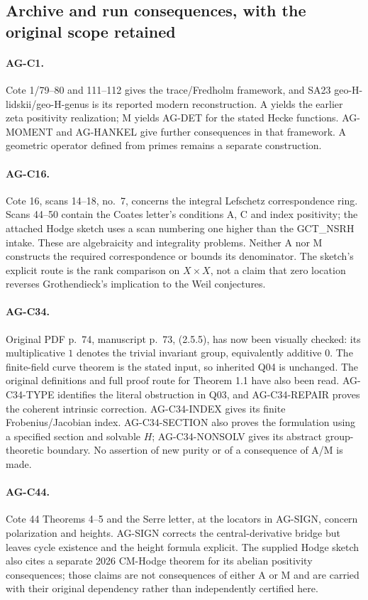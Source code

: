 \subsection{Archive and run consequences, with the original scope retained}
\label{ag:archive}

\paragraph{AG-C1.} Cote 1/79--80 and 111--112 gives the trace/Fredholm
framework, and SA23 geo-H-lidskii/geo-H-genus is its reported modern
reconstruction. A yields the earlier zeta positivity realization;
M yields AG-DET for the stated Hecke functions. AG-MOMENT and AG-HANKEL
give further consequences in that framework. A geometric operator defined
from primes remains a separate construction.

\paragraph{AG-C16.} Cote 16, scans 14--18, no.~7, concerns the integral
Lefschetz correspondence ring. Scans 44--50 contain the Coates letter's
conditions A, C and index positivity; the attached Hodge sketch uses a scan
numbering one higher than the GCT\_NSRH intake. These are algebraicity and
integrality problems. Neither A nor M constructs the required
correspondence or bounds its denominator. The sketch's explicit route is
the rank comparison on $X\times X$, not a claim that zero location
reverses Grothendieck's implication to the Weil conjectures.

\paragraph{AG-C34.} Original PDF p.~74, manuscript p.~73, (2.5.5),
has now been visually checked: its multiplicative $1$ denotes the trivial
invariant group, equivalently additive $0$. The finite-field curve theorem
is the stated input, so inherited Q04 is unchanged. The original
definitions and full proof route for Theorem 1.1 have also been read.
AG-C34-TYPE identifies the literal obstruction in Q03, and
AG-C34-REPAIR proves the coherent intrinsic correction. AG-C34-INDEX
gives its finite Frobenius/Jacobian index. AG-C34-SECTION also proves
the formulation using a specified section and solvable $H$;
AG-C34-NONSOLV gives its abstract group-theoretic boundary.
No assertion of new purity or
of a consequence of A/M is made.

\paragraph{AG-C44.} Cote 44 Theorems 4--5 and the Serre letter, at the
locators in AG-SIGN, concern polarization and heights. AG-SIGN corrects
the central-derivative bridge but leaves cycle existence and the
height formula explicit. The supplied Hodge sketch also cites a separate
2026 CM-Hodge theorem for its abelian positivity consequences; those
claims are not consequences of either A or M and are carried with
their original dependency rather than independently certified here.

